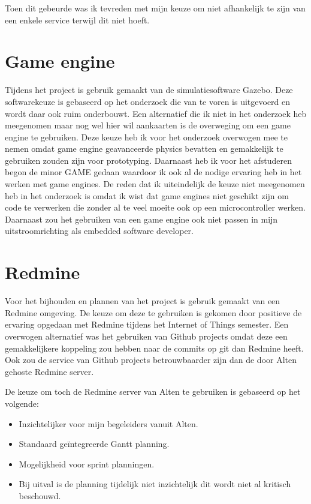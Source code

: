 \documentclass[a4paper, 11pt, oneside]{report}
\begin{document}
Toen dit gebeurde was ik tevreden met mijn keuze om niet afhankelijk te zijn van een enkele service terwijl dit niet hoeft.

\section{Game engine}

Tijdens het project is gebruik gemaakt van de simulatiesoftware Gazebo. Deze softwarekeuze is gebaseerd op het onderzoek die van te voren is uitgevoerd en wordt daar ook ruim onderbouwt. Een alternatief die ik niet in het onderzoek heb meegenomen maar nog wel hier wil aankaarten is de overweging om een game engine te gebruiken. Deze keuze heb ik voor het onderzoek overwogen mee te nemen omdat game engine geavanceerde physics bevatten en gemakkelijk te gebruiken zouden zijn voor prototyping. Daarnaast heb ik voor het afstuderen begon de minor GAME gedaan waardoor ik ook al de nodige ervaring heb in het werken met game engines. De reden dat ik uiteindelijk de keuze niet meegenomen heb in het onderzoek is omdat ik wist dat game engines niet geschikt zijn om code te verwerken die zonder al te veel moeite ook op een microcontroller werken. Daarnaast zou het gebruiken van een game engine ook niet passen in mijn uitstroomrichting als embedded software developer.

\section{Redmine}

Voor het bijhouden en plannen van het project is gebruik gemaakt van een Redmine omgeving. 
De keuze om deze te gebruiken is gekomen door positieve de ervaring opgedaan met Redmine tijdens het Internet of Things semester.
Een overwogen alternatief was het gebruiken van Github projects omdat deze een gemakkelijkere koppeling zou hebben naar de commits op git dan Redmine heeft. Ook zou de service van Github projects betrouwbaarder zijn dan de door Alten gehoste Redmine server.

De keuze om toch de Redmine server van Alten te gebruiken is gebaseerd op het volgende:
\begin{itemize}
	\item Inzichtelijker voor mijn begeleiders vanuit Alten. 
	\item Standaard geïntegreerde Gantt planning.
	\item Mogelijkheid voor sprint planningen.
	\item Bij uitval is de planning tijdelijk niet inzichtelijk dit wordt niet al kritisch beschouwd.  
\end{itemize}   
\end{document}
